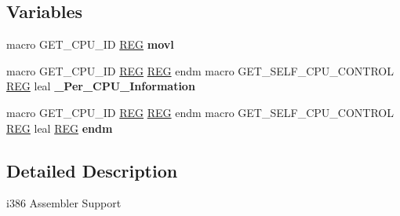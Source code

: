 \subsection*{Variables}
\begin{DoxyCompactItemize}
\item 
\mbox{\label{group__RTEMSScoreCPUi386ASM_ga1998b2f9bd042d5e71949749f7681103}} 
macro G\+E\+T\+\_\+\+C\+P\+U\+\_\+\+ID \mbox{\hyperlink{group__RTEMSScoreCPUx86-64ASM_gacee196421e9a06f7700bb3064b13b37a}{R\+EG}} {\bfseries movl}
\item 
\mbox{\label{group__RTEMSScoreCPUi386ASM_ga6582f5fce331e406522ad959a5db4cd9}} 
macro G\+E\+T\+\_\+\+C\+P\+U\+\_\+\+ID \mbox{\hyperlink{group__RTEMSScoreCPUx86-64ASM_gacee196421e9a06f7700bb3064b13b37a}{R\+EG}} \mbox{\hyperlink{group__RTEMSScoreCPUx86-64ASM_gacee196421e9a06f7700bb3064b13b37a}{R\+EG}} endm macro G\+E\+T\+\_\+\+S\+E\+L\+F\+\_\+\+C\+P\+U\+\_\+\+C\+O\+N\+T\+R\+OL \mbox{\hyperlink{group__RTEMSScoreCPUx86-64ASM_gacee196421e9a06f7700bb3064b13b37a}{R\+EG}} leal {\bfseries \+\_\+\+Per\+\_\+\+C\+P\+U\+\_\+\+Information}
\item 
\mbox{\label{group__RTEMSScoreCPUi386ASM_ga5ef9b534d037aa65c78c9d6ad2490836}} 
macro G\+E\+T\+\_\+\+C\+P\+U\+\_\+\+ID \mbox{\hyperlink{group__RTEMSScoreCPUx86-64ASM_gacee196421e9a06f7700bb3064b13b37a}{R\+EG}} \mbox{\hyperlink{group__RTEMSScoreCPUx86-64ASM_gacee196421e9a06f7700bb3064b13b37a}{R\+EG}} endm macro G\+E\+T\+\_\+\+S\+E\+L\+F\+\_\+\+C\+P\+U\+\_\+\+C\+O\+N\+T\+R\+OL \mbox{\hyperlink{group__RTEMSScoreCPUx86-64ASM_gacee196421e9a06f7700bb3064b13b37a}{R\+EG}} leal \mbox{\hyperlink{group__RTEMSScoreCPUx86-64ASM_gacee196421e9a06f7700bb3064b13b37a}{R\+EG}} {\bfseries endm}
\end{DoxyCompactItemize}


\subsection{Detailed Description}
i386 Assembler Support 


